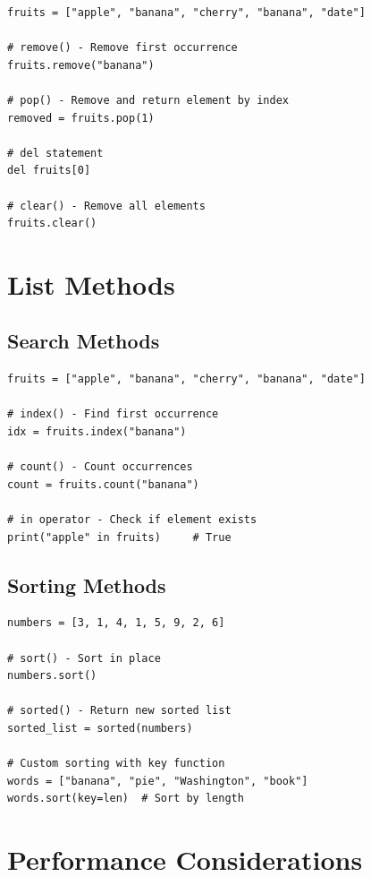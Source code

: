 \documentclass[12pt,a4paper]{article}
\begin{document}
\begin{lstlisting}
fruits = ["apple", "banana", "cherry", "banana", "date"]

# remove() - Remove first occurrence
fruits.remove("banana")

# pop() - Remove and return element by index
removed = fruits.pop(1)

# del statement
del fruits[0]

# clear() - Remove all elements
fruits.clear()
\end{lstlisting}

\section{List Methods}

\subsection{Search Methods}

\begin{lstlisting}
fruits = ["apple", "banana", "cherry", "banana", "date"]

# index() - Find first occurrence
idx = fruits.index("banana")

# count() - Count occurrences
count = fruits.count("banana")

# in operator - Check if element exists
print("apple" in fruits)     # True
\end{lstlisting}

\subsection{Sorting Methods}

\begin{lstlisting}
numbers = [3, 1, 4, 1, 5, 9, 2, 6]

# sort() - Sort in place
numbers.sort()

# sorted() - Return new sorted list
sorted_list = sorted(numbers)

# Custom sorting with key function
words = ["banana", "pie", "Washington", "book"]
words.sort(key=len)  # Sort by length
\end{lstlisting}

\section{Performance Considerations}
\end{document}

